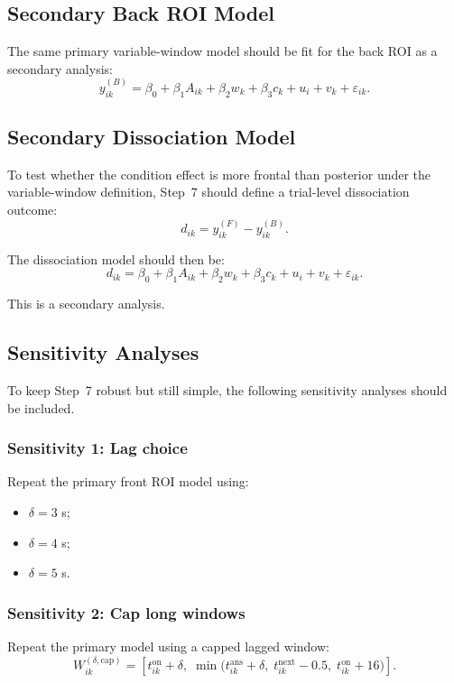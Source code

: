 \documentclass[11pt]{article}
\begin{document}
\subsection{Secondary Back ROI Model}
The same primary variable-window model should be fit for the back ROI as a secondary analysis:
\begin{equation}
y^{(B)}_{ik}
=
\beta_0
+
\beta_1 A_{ik}
+
\beta_2 w_k
+
\beta_3 c_k
+
u_i
+
v_k
+
\varepsilon_{ik}.
\end{equation}

\subsection{Secondary Dissociation Model}
To test whether the condition effect is more frontal than posterior under the variable-window definition,
Step~7 should define a trial-level dissociation outcome:
\begin{equation}
d_{ik} = y^{(F)}_{ik} - y^{(B)}_{ik}.
\end{equation}

The dissociation model should then be:
\begin{equation}
d_{ik}
=
\beta_0
+
\beta_1 A_{ik}
+
\beta_2 w_k
+
\beta_3 c_k
+
u_i
+
v_k
+
\varepsilon_{ik}.
\end{equation}

This is a secondary analysis.

\subsection{Sensitivity Analyses}
To keep Step~7 robust but still simple, the following sensitivity analyses should be included.

\subsubsection{Sensitivity 1: Lag choice}
Repeat the primary front ROI model using:
\begin{itemize}
    \item \(\delta = 3\) s;
    \item \(\delta = 4\) s;
    \item \(\delta = 5\) s.
\end{itemize}

\subsubsection{Sensitivity 2: Cap long windows}
Repeat the primary model using a capped lagged window:
\begin{equation}
W^{(\delta,\mathrm{cap})}_{ik}
=
\left[
t^{\mathrm{on}}_{ik} + \delta,\;
\min\!\bigl(t^{\mathrm{ans}}_{ik} + \delta,\; t^{\mathrm{next}}_{ik} - 0.5,\; t^{\mathrm{on}}_{ik} + 16\bigr)
\right].
\end{equation}
\end{document}
